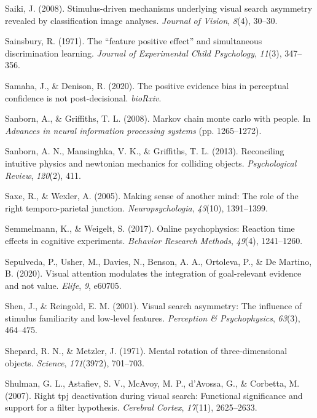 \documentclass[12pt,twoside]{reedthesis}
\begin{document}
\leavevmode\hypertarget{ref-saiki2008stimulus}{}%
Saiki, J. (2008). Stimulus-driven mechanisms underlying visual search asymmetry revealed by classification image analyses. \emph{Journal of Vision}, \emph{8}(4), 30--30.

\leavevmode\hypertarget{ref-sainsbury1971feature}{}%
Sainsbury, R. (1971). The ``feature positive effect'' and simultaneous discrimination learning. \emph{Journal of Experimental Child Psychology}, \emph{11}(3), 347--356.

\leavevmode\hypertarget{ref-samaha2020positive}{}%
Samaha, J., \& Denison, R. (2020). The positive evidence bias in perceptual confidence is not post-decisional. \emph{bioRxiv}.

\leavevmode\hypertarget{ref-sanborn2008markov}{}%
Sanborn, A., \& Griffiths, T. L. (2008). Markov chain monte carlo with people. In \emph{Advances in neural information processing systems} (pp. 1265--1272).

\leavevmode\hypertarget{ref-sanborn2013reconciling}{}%
Sanborn, A. N., Mansinghka, V. K., \& Griffiths, T. L. (2013). Reconciling intuitive physics and newtonian mechanics for colliding objects. \emph{Psychological Review}, \emph{120}(2), 411.

\leavevmode\hypertarget{ref-saxe2005making}{}%
Saxe, R., \& Wexler, A. (2005). Making sense of another mind: The role of the right temporo-parietal junction. \emph{Neuropsychologia}, \emph{43}(10), 1391--1399.

\leavevmode\hypertarget{ref-semmelmann2017online}{}%
Semmelmann, K., \& Weigelt, S. (2017). Online psychophysics: Reaction time effects in cognitive experiments. \emph{Behavior Research Methods}, \emph{49}(4), 1241--1260.

\leavevmode\hypertarget{ref-sepulveda2020visual}{}%
Sepulveda, P., Usher, M., Davies, N., Benson, A. A., Ortoleva, P., \& De Martino, B. (2020). Visual attention modulates the integration of goal-relevant evidence and not value. \emph{Elife}, \emph{9}, e60705.

\leavevmode\hypertarget{ref-shen2001visual}{}%
Shen, J., \& Reingold, E. M. (2001). Visual search asymmetry: The influence of stimulus familiarity and low-level features. \emph{Perception \& Psychophysics}, \emph{63}(3), 464--475.

\leavevmode\hypertarget{ref-shepard1971mental}{}%
Shepard, R. N., \& Metzler, J. (1971). Mental rotation of three-dimensional objects. \emph{Science}, \emph{171}(3972), 701--703.

\leavevmode\hypertarget{ref-shulman2007right}{}%
Shulman, G. L., Astafiev, S. V., McAvoy, M. P., d'Avossa, G., \& Corbetta, M. (2007). Right tpj deactivation during visual search: Functional significance and support for a filter hypothesis. \emph{Cerebral Cortex}, \emph{17}(11), 2625--2633.
\end{document}
